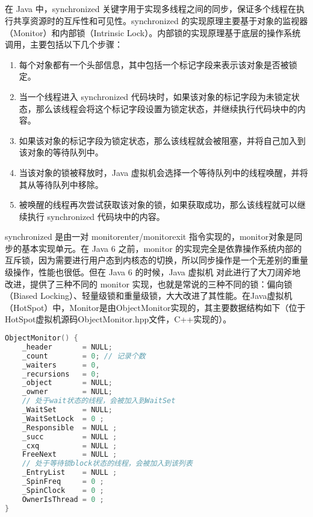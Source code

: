 \documentclass[../../../interview-questions.tex]{subfiles}
\begin{document}
\subsection{\color{red}{synchronized的实现原理是什么}}

在 Java 中，synchronized 关键字用于实现多线程之间的同步，保证多个线程在执行共享资源时的互斥性和可见性。synchronized 的实现原理主要基于对象的监视器（Monitor）和内部锁（Intrinsic Lock）。内部锁的实现原理基于底层的操作系统调用，主要包括以下几个步骤：

\begin{enumerate}
    \item {每个对象都有一个头部信息，其中包括一个标记字段来表示该对象是否被锁定。}
    \item {当一个线程进入 synchronized 代码块时，如果该对象的标记字段为未锁定状态，那么该线程会将这个标记字段设置为锁定状态，并继续执行代码块中的内容。}
    \item {如果该对象的标记字段为锁定状态，那么该线程就会被阻塞，并将自己加入到该对象的等待队列中。}
    \item {当该对象的锁被释放时，Java 虚拟机会选择一个等待队列中的线程唤醒，并将其从等待队列中移除。}
    \item {被唤醒的线程再次尝试获取该对象的锁，如果获取成功，那么该线程就可以继续执行 synchronized 代码块中的内容。}
\end{enumerate}

synchronized 是由一对 monitorenter/monitorexit 指令实现的，monitor对象是同步的基本实现单元。在 Java 6 之前，monitor 的实现完全是依靠操作系统内部的互斥锁，因为需要进行用户态到内核态的切换，所以同步操作是一个无差别的重量级操作，性能也很低。但在 Java 6 的时候，Java 虚拟机 对此进行了大刀阔斧地改进，提供了三种不同的 monitor 实现，也就是常说的三种不同的锁：偏向锁（Biased Locking）、轻量级锁和重量级锁，大大改进了其性能。在Java虚拟机（HotSpot）中，Monitor是由ObjectMonitor实现的，其主要数据结构如下（位于HotSpot虚拟机源码ObjectMonitor.hpp文件，C++实现的）。

\begin{lstlisting}[language=C++]
ObjectMonitor() {
    _header       = NULL;
    _count        = 0; // 记录个数
    _waiters      = 0,
    _recursions   = 0;
    _object       = NULL;
    _owner        = NULL;
    // 处于wait状态的线程，会被加入到WaitSet
    _WaitSet      = NULL; 
    _WaitSetLock  = 0 ;
    _Responsible  = NULL ;
    _succ         = NULL ;
    _cxq          = NULL ;
    FreeNext      = NULL ;
    // 处于等待锁block状态的线程，会被加入到该列表
    _EntryList    = NULL ; 
    _SpinFreq     = 0 ;
    _SpinClock    = 0 ;
    OwnerIsThread = 0 ;
}
\end{lstlisting}
\end{document}
